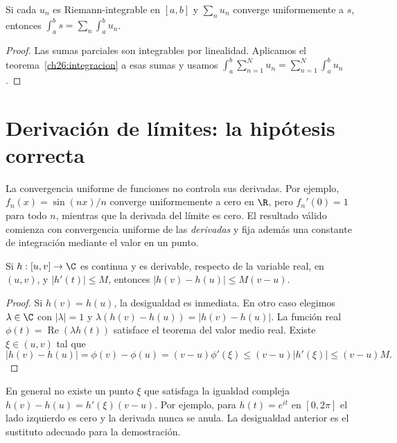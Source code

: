 \begin{corolario}
Si cada $u_n$ es Riemann-integrable en $[a,b]$ y $\sum_nu_n$ converge uniformemente a $s$, entonces
$\int_a^bs=\sum_n\int_a^bu_n$.
\end{corolario}
\begin{proof}
Las sumas parciales son integrables por linealidad. Aplicamos el teorema~\ref{ch26:integracion} a esas sumas y usamos $\int_a^b\sum_{n=1}^Nu_n=\sum_{n=1}^N\int_a^bu_n$.
\end{proof}

\section{Derivación de límites: la hipótesis correcta}
La convergencia uniforme de funciones no controla sus derivadas. Por ejemplo, $f_n(x)=\sin(nx)/n$ converge uniformemente a cero en $\R$, pero $f_n'(0)=1$ para todo $n$, mientras que la derivada del límite es cero. El resultado válido comienza con convergencia uniforme de las \emph{derivadas} y fija además una constante de integración mediante el valor en un punto.

\begin{lema}\label{ch26:tvmdesigualdad}
Si $h:[u,v]\to\C$ es continua y es derivable, respecto de la variable real, en $(u,v)$, y $|h'(t)|\le M$, entonces $|h(v)-h(u)|\le M(v-u)$.
\end{lema}
\begin{proof}
Si $h(v)=h(u)$, la desigualdad es inmediata. En otro caso elegimos $\lambda\in\C$ con $|\lambda|=1$ y $\lambda(h(v)-h(u))=|h(v)-h(u)|$. La función real $\phi(t)=\operatorname{Re}(\lambda h(t))$ satisface el teorema del valor medio real. Existe $\xi\in(u,v)$ tal que
\[
 |h(v)-h(u)|=\phi(v)-\phi(u)=(v-u)\phi'(\xi)
 \le(v-u)|h'(\xi)|\le(v-u)M.
\]
\end{proof}

En general no existe un punto $\xi$ que satisfaga la igualdad compleja $h(v)-h(u)=h'(\xi)(v-u)$. Por ejemplo, para $h(t)=e^{it}$ en $[0,2\pi]$ el lado izquierdo es cero y la derivada nunca se anula. La desigualdad anterior es el sustituto adecuado para la demostración.

